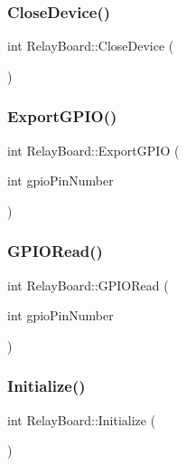 \subsubsection{\texorpdfstring{Close\+Device()}{CloseDevice()}}
{\footnotesize\ttfamily int Relay\+Board\+::\+Close\+Device (\begin{DoxyParamCaption}{ }\end{DoxyParamCaption})\hspace{0.3cm}{\ttfamily [private]}}

\mbox{\label{classRelayBoard_aa5394e9044c4271f9dcd9f08b9310b5b}} 
\subsubsection{\texorpdfstring{Export\+G\+P\+I\+O()}{ExportGPIO()}}
{\footnotesize\ttfamily int Relay\+Board\+::\+Export\+G\+P\+IO (\begin{DoxyParamCaption}\item[{int}]{gpio\+Pin\+Number }\end{DoxyParamCaption})}

\mbox{\label{classRelayBoard_aced41245b932daad1709cc8d3b07bc4b}} 
\subsubsection{\texorpdfstring{G\+P\+I\+O\+Read()}{GPIORead()}}
{\footnotesize\ttfamily int Relay\+Board\+::\+G\+P\+I\+O\+Read (\begin{DoxyParamCaption}\item[{int}]{gpio\+Pin\+Number }\end{DoxyParamCaption})}

\mbox{\label{classRelayBoard_a49759cb3cdcb6c2ccd7fbb44eb34b260}} 
\subsubsection{\texorpdfstring{Initialize()}{Initialize()}}
{\footnotesize\ttfamily int Relay\+Board\+::\+Initialize (\begin{DoxyParamCaption}{ }\end{DoxyParamCaption})}

